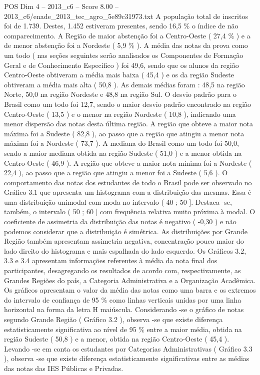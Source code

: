 \begin{textsample}{POS Dim 4 – 2013\_c6 – Score 8.00 – 2013\_c6/enade\_2013\_tec\_agro\_5e89c31973.txt}
A população total de inscritos foi de 1.739.
Destes, 1.452 estiveram presentes, sendo 16,5 \% o índice de não comparecimento.
A Região de maior abstenção foi a Centro-Oeste ( 27,4 \% ) e a de menor abstenção foi a Nordeste ( 5,9 \% ).
A média das notas da prova como um todo ( nas seções seguintes serão analisados os Componentes de Formação Geral e de Conhecimento Específico ) foi 49,6, sendo que os alunos da região Centro-Oeste obtiveram a média mais baixa ( 45,4 ) e os da região Sudeste obtiveram a média mais alta ( 50,8 ).
As demais médias foram : 48,5 na região Norte, 50,0 na região Nordeste e 48,8 na região Sul.
O desvio padrão para o Brasil como um todo foi 12,7, sendo o maior desvio padrão encontrado na região Centro-Oeste ( 13,5 ) e o menor na região Nordeste ( 10,8 ), indicando uma menor dispersão das notas desta última região.
A região que obteve a maior nota máxima foi a Sudeste ( 82,8 ), ao passo que a região que atingiu a menor nota máxima foi a Nordeste ( 73,7 ).
A mediana do Brasil como um todo foi 50,0, sendo a maior mediana obtida na região Sudeste ( 51,0 ) e a menor obtida na Centro-Oeste ( 46,9 ).
A região que obteve a maior nota mínima foi a Nordeste ( 22,4 ), ao passo que a região que atingiu a menor foi a Sudeste ( 5,6 ).
O comportamento das notas dos estudantes de todo o Brasil pode ser observado no Gráfico 3.1 que apresenta um histograma com a distribuição das mesmas.
Essa é uma distribuição unimodal com moda no intervalo ( 40 ; 50 ].
Destaca -se, também, o intervalo ( 50 ; 60 ] com frequência relativa muito próxima à modal.
O coeficiente de assimetria da distribuição das notas é negativo ( -0,30 ) e não podemos considerar que a distribuição é simétrica.
As distribuições por Grande Região também apresentam assimetria negativa, concentração pouco maior do lado direito do histograma e mais espalhada do lado esquerdo.
Os Gráficos 3.2, 3.3 e 3.4 apresentam informações referentes à média da nota final dos participantes, desagregando os resultados de acordo com, respectivamente, as Grandes Regiões do país, a Categoria Administrativa e a Organização Acadêmica.
Os gráficos apresentam o valor da média das notas como uma barra e os extremos do intervalo de confiança de 95 \% como linhas verticais unidas por uma linha horizontal na forma da letra H maiúscula.
Considerando -se o gráfico de notas segundo Grande Região ( Gráfico 3.2 ), observa -se que existe diferença estatisticamente significativa ao nível de 95 \% entre a maior média, obtida na região Sudeste ( 50,8 ) e a menor, obtida na região Centro-Oeste ( 45,4 ).
Levando -se em conta os estudantes por Categorias Administrativas ( Gráfico 3.3 ), observa -se que existe diferença estatisticamente significativas entre as médias das notas das IES Públicas e Privadas.

\end{textsample}
